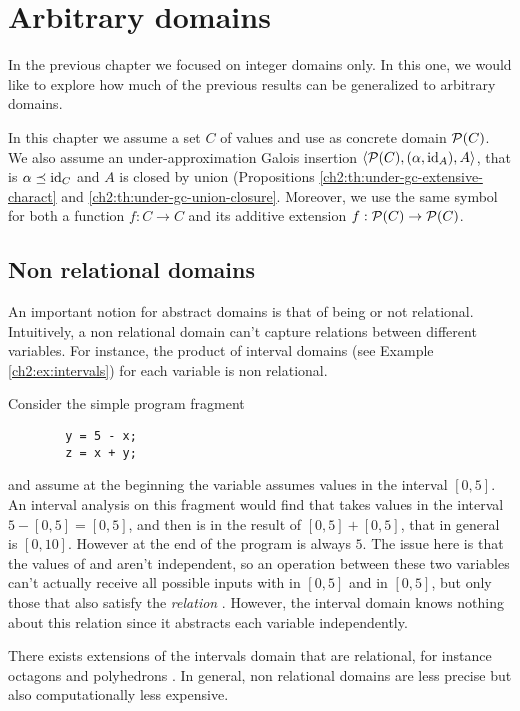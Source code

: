 \chapter{Arbitrary domains}\label{ch5:arbitrary-domains}
In the previous chapter we focused on integer domains only. In this one, we would like to explore how much of the previous results can be generalized to arbitrary domains.

In this chapter we assume a set $C$ of values and use as concrete domain $\mathcal{P}(C)$. We also assume an under-approximation Galois insertion $\langle \mathcal{P}(C), (\alpha, \text{id}_{A}), A \rangle$, that is $\alpha \preceq \text{id}_C$ and $A$ is closed by union (Propositions \ref{ch2:th:under-gc-extensive-charact} and \ref{ch2:th:under-gc-union-closure}.
Moreover, we use the same symbol for both a function $f : C \rightarrow C$ and its additive extension $f: \mathcal{P}(C) \rightarrow \mathcal{P}(C)$.

\section{Non relational domains}
An important notion for abstract domains is that of being or not relational. Intuitively, a non relational domain can't capture relations between different variables. For instance, the product of interval domains (see Example \ref{ch2:ex:intervals}) for each variable is non relational.
\begin{example}
	Consider the simple program fragment
	\begin{verbatim}
		y = 5 - x;
		z = x + y;
	\end{verbatim}
	and assume at the beginning the variable  assumes values in the interval $[0, 5]$. An interval analysis on this fragment would find that  takes values in the interval $5 - [0, 5] = [0, 5]$, and then  is in the result of $[0, 5] + [0, 5]$, that in general is $[0, 10]$. However at the end of the program  is always $5$.
	The issue here is that the values of  and  aren't independent, so an operation between these two variables can't actually receive all possible inputs with  in $[0, 5]$ and  in $[0, 5]$, but only those that also satisfy the \textit{relation} . However, the interval domain knows nothing about this relation since it abstracts each variable independently.
\end{example}
There exists extensions of the intervals domain that are relational, for instance octagons \cite{mine-octagons} and polyhedrons \cite{cousot-polyhedrons}. In general, non relational domains are less precise but also computationally less expensive.

